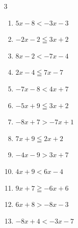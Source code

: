 \begin{multicols}{3}
\begin{enumerate}

  \item $5x-8<-3x-3$


\columnbreak %

  \item $-2x-2\leqq 3x+2$


  \item $8x-2<-7x-4$


  \item $2x-4\leqq 7x-7$


  \item $-7x-8<4x+7$


  \item $-5x+9\leqq 3x+2$


  \item $-8x+7>-7x+1$

        \phantom{$\displaystyle x<6$}

  \item $7x+9\leqq 2x+2$


  \item $-4x-9>3x+7$


  \item $4x+9<6x-4$


  \item $9x+7\geqq -6x+6$


  \item $6x+8>-8x-3$


  \item $-8x+4<-3x-7$


\end{enumerate}
\end{multicols}
